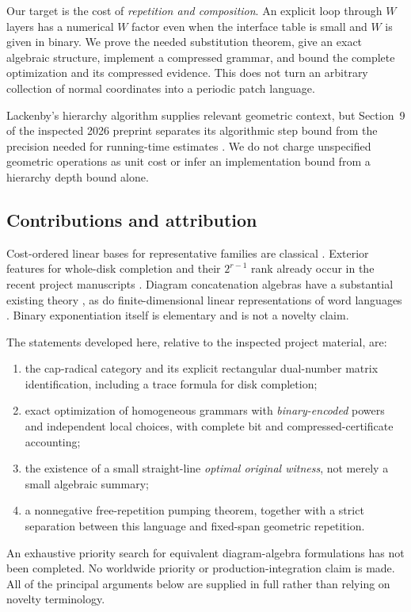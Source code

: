 \documentclass[11pt,a4paper]{article}
\theoremstyle{definition}
\begin{document}
Our target is the cost of \emph{repetition and composition}. An explicit loop through $W$ layers has a numerical $W$ factor even when the interface table is small and $W$ is given in binary. We prove the needed substitution theorem, give an exact algebraic structure, implement a compressed grammar, and bound the complete optimization and its compressed evidence. This does not turn an arbitrary collection of normal coordinates into a periodic patch language.

Lackenby's hierarchy algorithm supplies relevant geometric context, but Section~9 of the inspected 2026 preprint separates its algorithmic step bound from the precision needed for running-time estimates \cite{lackenby}. We do not charge unspecified geometric operations as unit cost or infer an implementation bound from a hierarchy depth bound alone.

\subsection{Contributions and attribution}
Cost-ordered linear bases for representative families are classical \cite{rankbased,representative}. Exterior features for whole-disk completion and their $2^{r-1}$ rank already occur in the recent project manuscripts \cite{cycle,rooted,signed}. Diagram concatenation algebras have a substantial existing theory \cite{partition}, as do finite-dimensional linear representations of word languages \cite{rational}. Binary exponentiation itself is elementary and is not a novelty claim.

The statements developed here, relative to the inspected project material, are:
\begin{enumerate}[label=(\roman*)]
\item the cap-radical category and its explicit rectangular dual-number matrix identification, including a trace formula for disk completion;
\item exact optimization of homogeneous grammars with \emph{binary-encoded} powers and independent local choices, with complete bit and compressed-certificate accounting;
\item the existence of a small straight-line \emph{optimal original witness}, not merely a small algebraic summary;
\item a nonnegative free-repetition pumping theorem, together with a strict separation between this language and fixed-span geometric repetition.
\end{enumerate}
An exhaustive priority search for equivalent diagram-algebra formulations has not been completed. No worldwide priority or production-integration claim is made. All of the principal arguments below are supplied in full rather than relying on novelty terminology.
\end{document}
